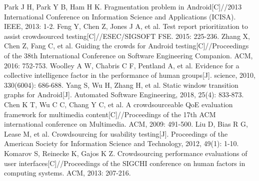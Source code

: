 \documentclass[conference]{IEEEtran}
\begin{document}







\begin{thebibliography}{00}
 Park J H, Park Y B, Ham H K. Fragmentation problem in Android[C]//2013 International Conference on Information Science and Applications (ICISA). IEEE, 2013: 1-2.
 Feng Y, Chen Z, Jones J A, et al. Test report prioritization to assist crowdsourced testing[C]//ESEC/SIGSOFT FSE. 2015: 225-236.
 Zhang X, Chen Z, Fang C, et al. Guiding the crowds for Android testing[C]//Proceedings of the 38th International Conference on Software Engineering Companion. ACM, 2016: 752-753.
 Woolley A W, Chabris C F, Pentland A, et al. Evidence for a collective intelligence factor in the performance of human groups[J]. science, 2010, 330(6004): 686-688.
 Yang S, Wu H, Zhang H, et al. Static window transition graphs for Android[J]. Automated Software Engineering, 2018, 25(4): 833-873.
 Chen K T, Wu C C, Chang Y C, et al. A crowdsourceable QoE evaluation framework for multimedia content[C]//Proceedings of the 17th ACM international conference on Multimedia. ACM, 2009: 491-500.
 Liu D, Bias R G, Lease M, et al. Crowdsourcing for usability testing[J]. Proceedings of the American Society for Information Science and Technology, 2012, 49(1): 1-10.
 Komarov S, Reinecke K, Gajos K Z. Crowdsourcing performance evaluations of user interfaces[C]//Proceedings of the SIGCHI conference on human factors in computing systems. ACM, 2013: 207-216.
\end{thebibliography}
\end{document}
